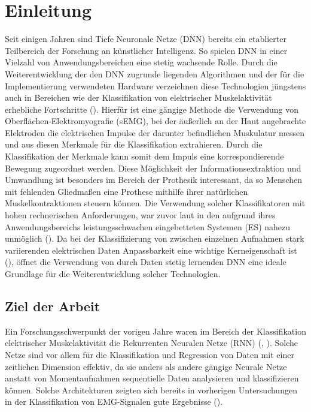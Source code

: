 \chapter{Einleitung}
\label{chap:einleitung}

Seit einigen Jahren sind Tiefe Neuronale Netze (DNN) bereits ein etablierter Teilbereich der
Forschung an künstlicher Intelligenz. So spielen DNN in einer Vielzahl von
Anwendungsbereichen eine stetig wachsende Rolle.
Durch die Weiterentwicklung der den DNN zugrunde liegenden Algorithmen und der für die
Implementierung verwendeten Hardware verzeichnen diese Technologien jüngstens auch in
Bereichen wie der Klassifikation von elektrischer Muskelaktivität erhebliche Fortschritte (\cite{Allard2019}). Hierfür ist
eine gängige Methode die Verwendung von Oberflächen-Elektromyografie (sEMG), bei der
äußerlich an der Haut angebrachte Elektroden die elektrischen Impulse der darunter befindlichen
Muskulatur messen und aus diesen Merkmale für die Klassifikation extrahieren. Durch die Klassifikation der Merkmale kann somit dem Impuls eine korrespondierende Bewegung zugeordnet werden. Diese Möglichkeit der Informationsextraktion und Umwandlung ist besonders im Bereich der Prothesik interessant, da so Menschen mit fehlenden Gliedmaßen eine Prothese mithilfe ihrer natürlichen Muskelkontraktionen steuern können. Die Verwendung solcher Klassifikatoren mit hohen rechnerischen Anforderungen, war zuvor laut \cite{Allard2019} in den aufgrund ihres Anwendungsbereichs leistungsschwachen eingebetteten Systemen (ES) nahezu unmöglich (\cite{Allard2019}).
Da bei der Klassifizierung von zwischen einzelnen Aufnahmen stark variierenden
elektrischen Daten Anpassbarkeit eine wichtige Kerneigenschaft ist (\cite{Kaufmann2013}), öffnet die
Verwendung von durch Daten stetig lernenden DNN eine ideale Grundlage für die
Weiterentwicklung solcher Technologien.

\section{Ziel der Arbeit}

Ein Forschungsschwerpunkt der vorigen Jahre waren im Bereich der Klassifikation elektrischer Muskelaktivität die Rekurrenten Neuralen Netze (RNN) (\cite{simao2019emg}, \cite{tsuji2000pattern}). Solche Netze sind vor allem für die Klassifikation und Regression von Daten mit einer zeitlichen Dimension effektiv, da sie anders als andere gängige Neurale Netze anstatt von Momentaufnahmen sequentielle Daten analysieren und klassifizieren können. Solche Architekturen zeigten sich bereits in vorherigen Untersuchungen in der Klassifikation von EMG-Signalen gute Ergebnisse (\cite{simao2019emg}).

